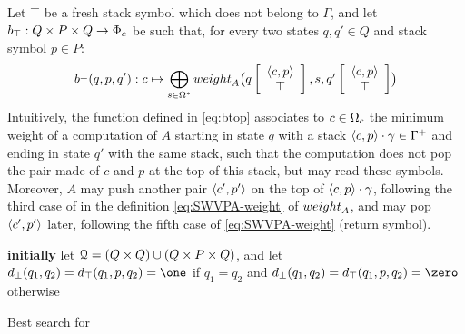 %
\noindent
Let $\top$ be a fresh stack symbol which does not belong to $\Gamma$,
and let $b_\top : Q \times P \times Q \to \Phic$ be such that,
for every two states $q, q' \in Q$ 
and stack symbol $p \in P$: %
\begin{equation}\label{eq:btop}
  b_\top(q, p, q') : c \mapsto \bigoplus_{s\in \Omega^*} 
  \textstyle
  \weight_A\bigl(\configup{q}{\< c, p> \stackup \top }, s, \configup{q'}{\<c, p> \stackup \top}\bigr)
\end{equation}
%
Intuitively, the function defined in \eqref{eq:btop}
associates to $c \in \Omegac$ 
the minimum weight of a computation of $A$
starting in state $q$ with a stack 
$\<c, p> \cdot \gamma \in \Gamma^+$ 
and ending in state $q'$ with the same stack,
such that the computation does not pop 
the pair made of $c$ and $p$ at the top of this stack,
but may read these symbols.
Moreover, $A$ may push another pair $\< c', p'>$ %
on the top of $\<c, p> \cdot \gamma$,
following the third case of 
in the definition \eqref{eq:SWVPA-weight} of $\weight_A$,
and may pop $\< c', p'>$ later, following the fifth case of \eqref{eq:SWVPA-weight} (return symbol). 

\begin{algorithm}

\textbf{initially} let $\mathcal{Q} = (Q \times Q) \cup (Q \times P \times Q)$, %
and let $d_\bot(q_1, q_2) = d_\top(q_1, p, q_2) = \one$ 
if $q_1 = q_2$ and $d_\bot(q_1, q_2) = d_\top(q_1, p, q_2) = \zero$ otherwise$\;$

\smallskip\noindent
{}
\caption{Best search for \SWVPA}
\label{algo:Dijkstra}
\end{algorithm}

